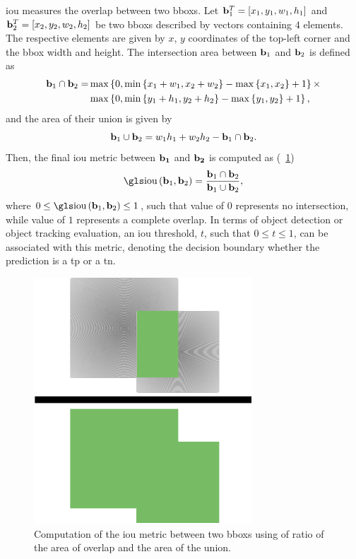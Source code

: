 \Gls{iou} measures the overlap between two \glspl{bbox}. Let ${\mathbf{b}}_{1}^{T} = \left[ {x_1, y_1, w_1, h_1} \right]$ and ${\mathbf{b}}_{2}^{T} = \left[ {x_2, y_2, w_2, h_2} \right]$ be two \glspl{bbox} described by vectors containing $4$ elements. The respective elements are given by $x$, $y$ coordinates of the top-left corner and the \gls{bbox} width and height. The intersection area between $\mathbf{b}_1$ and $\mathbf{b}_2$ is defined as
\begin{equation}
    \begin{aligned}
        \mathbf{b}_1 \cap \mathbf{b}_2 =
         & \max \left\{ {0,
            \min \left\{ {x_1 + w_1, x_2 + w_2} \right\} - \max \left\{ {x_1, x_2} \right\} + 1} \right\}
        \times                \\
         & \max \left\{ {0,
            \min \left\{ {y_1 + h_1, y_2 + h_2} \right\} - \max \left\{ {y_1, y_2} \right\} + 1} \right\},
    \end{aligned}
\end{equation}
and the area of their union is given by
\begin{equation}
    \mathbf{b}_1 \cup \mathbf{b}_2 = w_1 h_1 + w_2 h_2 - \mathbf{b}_1 \cap \mathbf{b}_2.
\end{equation}
Then, the final \gls{iou} metric between $\mathbf{b_1}$ and $\mathbf{b_2}$ is computed as (\figtext{}~\ref{fig:IntersectionOverUnion})
\begin{equation}
    \label{eq:IntersectionOverUnion}
    \func{\IOU}{\vect{b}_1, \vect{b}_2} =
    \frac{\vect{b}_1 \cap \vect{b}_2}{\vect{b}_1 \cup \vect{b}_2},
\end{equation}
where $0 \leq \func{\IOU}{\vect{b}_1, \vect{b}_2} \leq 1$, such that value of $0$ represents no intersection, while value of $1$ represents a complete overlap. In terms of object detection or object tracking evaluation, an \gls{iou} threshold, $t$, such that $0 \leq t \leq 1$, can be associated with this metric, denoting the decision boundary whether the prediction is a \gls{tp} or a \gls{tn}.

\begin{figure}[t]
    \centerline{\includegraphics[width=0.2\linewidth]{figures/theoretical_foundations/intersection_over_union.pdf}}
    \caption[\Gls{iou} visualization]{Computation of the \gls{iou} metric between two \glspl{bbox} using of ratio of the area of overlap and the area of the union.}
    \label{fig:IntersectionOverUnion}
\end{figure}

